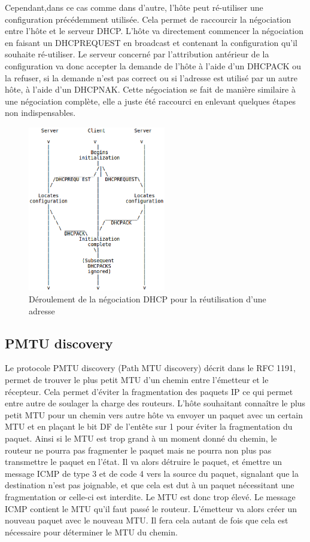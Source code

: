 Cependant,dans ce cas comme dans d'autre, l'hôte peut ré-utiliser une
configuration précédemment utilisée. Cela permet de raccourcir la négociation
entre l'hôte et le serveur DHCP. L'hôte va directement commencer la négociation
en faisant un DHCPREQUEST en broadcast et contenant la configuration qu'il
souhaite ré-utiliser. Le serveur concerné par l'attribution antérieur de la
configuration va donc accepter la demande de l'hôte à l'aide d'un DHCPACK ou la
refuser, si la demande n'est pas correct ou si l'adresse est utilisé par un
autre hôte, à l'aide d'un DHCPNAK.  Cette négociation se fait de manière
similaire à une négociation complète, elle a juste été raccourci en enlevant
quelques étapes non indispensables.

\begin{figure}[h]
\centering
\includegraphics[width=6cm]{./pics/timeline_dhcp_reuse_add.eps}
\caption{Déroulement de la négociation DHCP pour la réutilisation d'une adresse}
\label{fig:timelinedhcpreuseadd}
\end{figure}


\subsection{PMTU discovery}
Le protocole PMTU discovery (Path MTU discovery) décrit dans le RFC
1191\cite{url-RFC-PMTU}, permet de trouver le plus petit MTU d'un chemin entre
l'émetteur et le récepteur. Cela permet d'éviter la fragmentation des paquets
IP ce qui permet entre autre de soulager la charge des routeurs.  L'hôte
souhaitant connaître le plus petit MTU pour un chemin vers autre hôte va
envoyer un paquet avec un certain MTU et en plaçant le bit DF de l'entête sur 1
pour éviter la fragmentation du paquet. Ainsi si le MTU est trop grand à un
moment donné du chemin, le routeur ne pourra pas fragmenter le paquet mais ne
pourra non plus pas transmettre le paquet en l'état. Il va alors détruire le
paquet, et émettre un message ICMP de type 3 et de code 4 vers la source du
paquet, signalant que la destination n'est pas joignable, et que cela est dut à
un paquet nécessitant une fragmentation or celle-ci est interdite. Le MTU est
donc trop élevé. Le message ICMP contient le MTU qu'il faut passé le routeur.
L'émetteur va alors créer un nouveau paquet avec le nouveau MTU. Il fera cela
autant de fois que cela est nécessaire pour déterminer le MTU du chemin.

